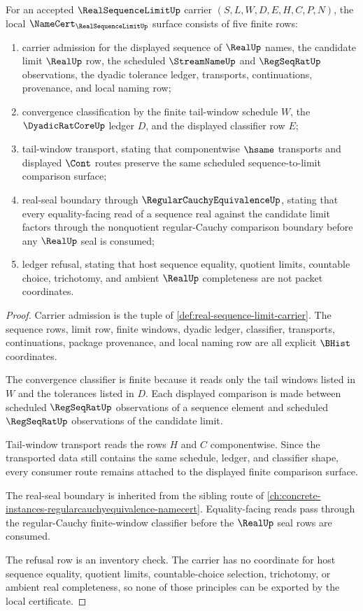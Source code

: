 \begin{theorem}\label{thm:real-sequence-limit-namecert-obligation-surface}
For an accepted $\RealSequenceLimitUp$ carrier $(S,L,W,D,E,H,C,P,N)$, the local $\NameCert_{\RealSequenceLimitUp}$ surface consists of five finite rows:
\begin{enumerate}
\item carrier admission for the displayed sequence of $\RealUp$ names, the candidate limit $\RealUp$ row, the scheduled $\StreamNameUp$ and $\RegSeqRatUp$ observations, the dyadic tolerance ledger, transports, continuations, provenance, and local naming row;
\item convergence classification by the finite tail-window schedule $W$, the $\DyadicRatCoreUp$ ledger $D$, and the displayed classifier row $E$;
\item tail-window transport, stating that componentwise $\hsame$ transports and displayed $\Cont$ routes preserve the same scheduled sequence-to-limit comparison surface;
\item real-seal boundary through $\RegularCauchyEquivalenceUp$, stating that every equality-facing read of a sequence real against the candidate limit factors through the nonquotient regular-Cauchy comparison boundary before any $\RealUp$ seal is consumed;
\item ledger refusal, stating that host sequence equality, quotient limits, countable choice, trichotomy, and ambient $\RealUp$ completeness are not packet coordinates.
\end{enumerate}
\end{theorem}
\begin{proof}
Carrier admission is the tuple of \autoref{def:real-sequence-limit-carrier}. The sequence rows, limit row, finite windows, dyadic ledger, classifier, transports, continuations, package provenance, and local naming row are all explicit $\BHist$ coordinates.

The convergence classifier is finite because it reads only the tail windows listed in $W$ and the tolerances listed in $D$. Each displayed comparison is made between scheduled $\RegSeqRatUp$ observations of a sequence element and scheduled $\RegSeqRatUp$ observations of the candidate limit.

Tail-window transport reads the rows $H$ and $C$ componentwise. Since the transported data still contains the same schedule, ledger, and classifier shape, every consumer route remains attached to the displayed finite comparison surface.

The real-seal boundary is inherited from the sibling route of \autoref{ch:concrete-instances-regularcauchyequivalence-namecert}. Equality-facing reads pass through the regular-Cauchy finite-window classifier before the $\RealUp$ seal rows are consumed.

The refusal row is an inventory check. The carrier has no coordinate for host sequence equality, quotient limits, countable-choice selection, trichotomy, or ambient real completeness, so none of those principles can be exported by the local certificate.
\end{proof}

